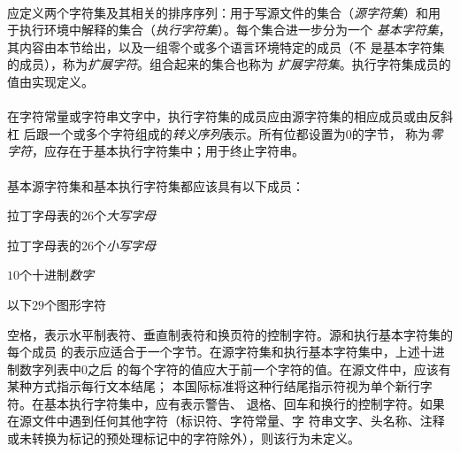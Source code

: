 \paragraph{}
应定义两个字符集及其相关的排序序列：用于写源文件的集合（\textit{源字符集}）和用
于执行环境中解释的集合（\textit{执行字符集}）。每个集合进一步分为一个
\textit{基本字符集}，其内容由本节给出，以及一组零个或多个语言环境特定的成员（不
是基本字符集的成员），称为\textit{扩展字符}。组合起来的集合也称为
\textit{扩展字符集}。执行字符集成员的值由实现定义。

\paragraph{}
在字符常量或字符串文字中，执行字符集的成员应由源字符集的相应成员或由反斜杠
\tm{\bs}后跟一个或多个字符组成的\textit{转义序列}表示。所有位都设置为$0$的字节，
称为\textit{零字符}，应存在于基本执行字符集中；用于终止字符串。

\paragraph{}
基本源字符集和基本执行字符集都应该具有以下成员：

拉丁字母表的$26$个\textit{大写字母}

\mbox{\qquad{}}

\mbox{\qquad{}}

拉丁字母表的$26$个\textit{小写字母}

\mbox{\qquad{}}

\mbox{\qquad{}}

$10$个十进制\textit{数字}

\mbox{\qquad{}}

以下$29$个图形字符

\mbox{\qquad{}}

\mbox{\qquad{}}

空格，表示水平制表符、垂直制表符和换页符的控制字符。源和执行基本字符集的每个成员
的表示应适合于一个字节。在源字符集和执行基本字符集中，上述十进制数字列表中0之后
的每个字符的值应大于前一个字符的值。在源文件中，应该有某种方式指示每行文本结尾；
本国际标准将这种行结尾指示符视为单个新行字符。在基本执行字符集中，应有表示警告、
退格、回车和换行的控制字符。如果在源文件中遇到任何其他字符（标识符、字符常量、字
符串文字、头名称、注释或未转换为标记的预处理标记中的字符除外），则该行为未定义。

